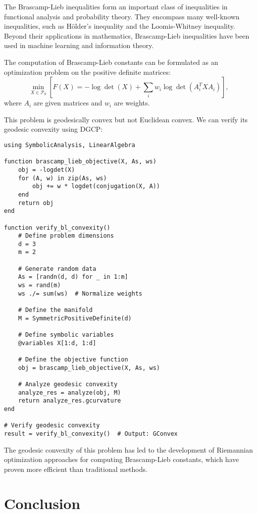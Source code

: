 The Brascamp-Lieb inequalities form an important class of inequalities in functional analysis and probability theory. They encompass many well-known inequalities, such as Hölder's inequality and the Loomis-Whitney inequality. Beyond their applications in mathematics, Brascamp-Lieb inequalities have been used in machine learning and information theory.

The computation of Brascamp-Lieb constants can be formulated as an optimization problem on the positive definite matrices:
\begin{equation}
\min_{X \in \mathcal{P}_d} \left[ F(X) = -\log \det(X) + \sum_i w_i \log \det(A_i^T X A_i) \right],
\end{equation}
where $A_i$ are given matrices and $w_i$ are weights.

This problem is geodesically convex but not Euclidean convex. We can verify its geodesic convexity using DGCP:

\begin{verbatim}
using SymbolicAnalysis, LinearAlgebra

function brascamp_lieb_objective(X, As, ws)
    obj = -logdet(X)
    for (A, w) in zip(As, ws)
        obj += w * logdet(conjugation(X, A))
    end
    return obj
end

function verify_bl_convexity()
    # Define problem dimensions
    d = 3
    m = 2
    
    # Generate random data
    As = [randn(d, d) for _ in 1:m]
    ws = rand(m)
    ws ./= sum(ws)  # Normalize weights
    
    # Define the manifold
    M = SymmetricPositiveDefinite(d)
    
    # Define symbolic variables
    @variables X[1:d, 1:d]
    
    # Define the objective function
    obj = brascamp_lieb_objective(X, As, ws)
    
    # Analyze geodesic convexity
    analyze_res = analyze(obj, M)
    return analyze_res.gcurvature
end

# Verify geodesic convexity
result = verify_bl_convexity()  # Output: GConvex
\end{verbatim}

The geodesic convexity of this problem has led to the development of Riemannian optimization approaches for computing Brascamp-Lieb constants, which have proven more efficient than traditional methods.

\section{Conclusion}


